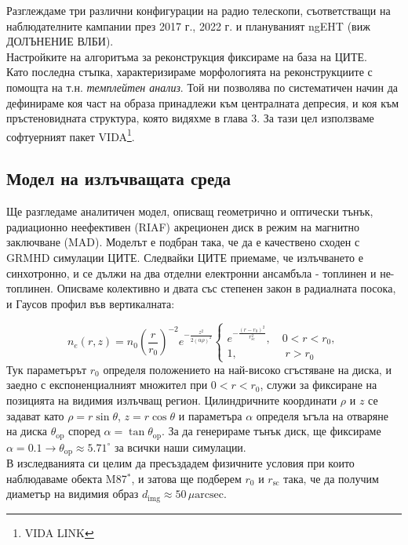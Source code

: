 Разглеждаме три различни конфигурации на радио телескопи, съответстващи на наблюдателните кампании през 2017 г., 2022 г. и плануваният ngEHT (виж ДОЛЪНЕНИЕ ВЛБИ).\\

Настройките на алгоритъма за реконструкция фиксираме на база на ЦИТЕ.\\

Като последна стъпка, характеризираме морфологията на реконструкциите с помощта на т.н. \emph{темплейтен анализ}. Той ни позволява по систематичен начин да дефинираме коя част на образа принадлежи към централната депресия, и коя към пръстеновидната структура, която видяхме в глава 3. За тази цел използваме софтуерният пакет VIDA\footnote{VIDA LINK}.

\subsection{Модел на излъчващата среда}

Ще разгледаме аналитичен модел, описващ геометрично и оптически тънък, радиационно неефективен (RIAF) акреционен диск в режим на магнитно заключване (MAD). Моделът е подбран така, че да е качествено сходен с GRMHD симулации ЦИТЕ. Следвайки ЦИТЕ приемаме, че излъчването е синхотронно, и се дължи на два отделни електронни ансамбъла - топлинен и не-топлинен. Описваме колективно и двата със степенен закон в радиалната посока, и Гаусов профил във вертикалната:

\begin{equation}
	n_e(r,z) = n_0\left(\frac{r}{r_0}\right)^{-2}e^{-\frac{z^2}{2(\alpha\rho)^2}}
	\begin{cases}
		e^{-\frac{(r-r_0)^2}{r^2_{\text{sc}}}},\quad 0 < r < r_0,\\
		1,\,\,\qquad\qquad r>r_0
	\end{cases}
\end{equation}
Тук параметърът $r_0$ определя положението на най-високо сгъстяване на диска, и заедно с експоненциалният множител при $0 < r < r_0$, служи за фиксиране на позицията на видимия излъчващ регион. Цилиндричните координати $\rho$ и $z$ се задават като $\rho = r\sin\theta$, $z = r\cos\theta$ и параметъра $\alpha$ определя ъгъла на отваряне на диска $\theta_{\text{op}}$ според $\alpha = \tan\theta_\text{op}$. За да генерираме тънък диск, ще фиксираме $\alpha = 0.1 \rightarrow \theta_{\text{op}}\approx 5.71^\circ$ за всички наши симулации.\\
В изследванията си целим да пресъздадем физичните условия при които наблюдаваме обекта M87$^*$, и затова ще подберем $r_0$ и $r_\text{sc}$ така, че да получим диаметър на видимия образ $d_\text{img}\approx 50\, \mu\text{arcsec}$.\\

